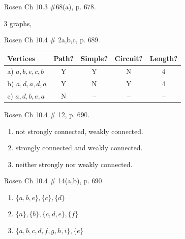 \begin{questions}
\begin{solution}
    \end{solution}




 Rosen Ch 10.3 \#68(a), p. 678.
    \ifprintanswers
        \vspace{-10pt}
    \fi
    \begin{solution}
        3 graphs, 
    \end{solution}



 Rosen Ch 10.4 \# 2a,b,c, p. 689.
   \ifprintanswers
        \vspace{-15pt}
   \fi
    \begin{solution}
    \begin{tabular}{lcccc}
        Vertices & Path? & Simple? & Circuit? & Length? \\
        \hline
        a) $a,b,e,c,b$     & Y & Y & N & 4 \\
        b) $a,d,a,d,a$     & Y & N & Y & 4 \\
        c) $a,d,b,e,a$     & N & -- & -- & -- \\
        \hline
    \end{tabular}
    \end{solution}



 Rosen Ch 10.4 \# 12, p. 690.
   \ifprintanswers
        \vspace{-15pt}
   \fi
    \begin{solution}
    \begin{enumerate}[label=(\alph*), topsep=0pt, itemsep=0pt, parsep=0pt]
        \item not strongly connected, weakly connected.
        \item  strongly connected and weakly connected.
        \item  neither strongly nor weakly connected.
    \end{enumerate}
    \end{solution}



 Rosen Ch 10.4 \# 14(a,b), p. 690
    \ifprintanswers
        \vspace{-15pt}
    \fi
    \begin{solution}
    \begin{enumerate}[label=(\alph*), topsep=0pt, itemsep=0pt, parsep=0pt]
        \item  $\{a,b,e\}, \{ c\}, \{d\} $  \hfill
        \item  $ \{a\}, \{b\}, \{c,d,e\}, \{f\} $ \hfill
        \item  $ \{a,b,c,d,f,g,h,i\}, \{e\} $
    \end{enumerate}
    \end{solution}




\end{questions}
